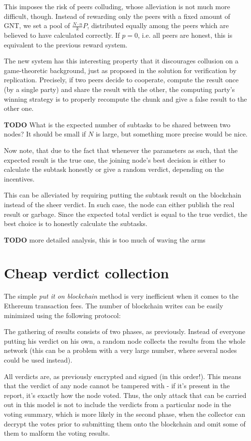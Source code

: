\documentclass[12pt]{article}
\begin{document}
This imposes the risk of peers colluding, whose alleviation is not much more difficult,
though. Instead of rewarding only the peers with a fixed amount of GNT, we set a pool
of $\frac{N \cdot n}{k} P$, distributed equally among the peers which are believed to have
calculated correctly. If $p = 0$, i.e. all peers are honest, this is equivalent to 
the previous reward system. 

The new system has this interesting property that it discourages collusion on a
game-theoretic background, just as proposed in the solution for verification by
replication. Precisely, if two peers decide to cooperate, compute the result once
(by a single party) and share the result with the other, the computing party's 
winning strategy is to properly recompute the chunk and give a false result to 
the other one. 

\textbf{TODO} What is the expected number of subtasks to be shared between two nodes? 
It should be small if $N$ is large, but something more precise would be nice.

Now note, that due to the fact that whenever the parameters as such, that 
the expected result is the true one, the joining node's best decision is
either to calculate the subtask honestly or give a random verdict,
depending on the incentives.

This can be alleviated by requiring putting the subtask result on the blockchain
instead of the sheer verdict. In such case, the node can either publish the 
real result or garbage. Since the expected total verdict is equal to the true 
verdict, the best choice is to honestly calculate the subtasks.

\textbf{TODO} more detailed analysis, this is too much of waving the arms

\section{Cheap verdict collection}
The simple \textit{put it on blockchain} method is very inefficient when it 
comes to the Ethereum transaction fees. The number of blockchain writes
can be easily minimized using the following protocol:

The gathering of results consists of two phases, as previously. Instead of 
everyone putting his verdict on his own, a random node collects the results 
from the whole network (this can be a problem with a very large number, where
several nodes could be used instead).

All verdicts are, as previously encrypted and signed (in this order!). This
means that the verdict of any node cannot be tampered with - if it's present
in the report, it's exactly how the node voted. Thus, the only attack that
can be carried out in this model is not to include the verdicts from a
particular node in the voting summary, which is more likely in the second
phase, when the collector can decrypt the votes prior to submitting them 
onto the blockchain and omit some of them to malform the voting results.
\end{document}
